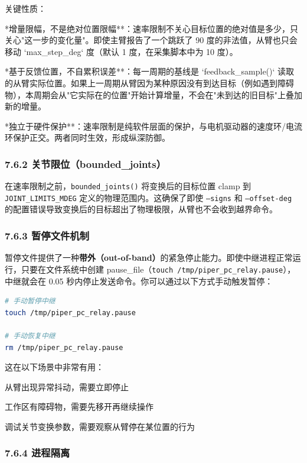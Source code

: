 \documentclass[UTF8,a4paper,11pt]{ctexart}
\begin{document}
{关键性质：
\item **增量限幅，不是绝对位置限幅**：速率限制不关心目标位置的绝对值是多少，只关心"这一步的变化量"。即使主臂报告了一个跳跃了 90 度的非法值，从臂也只会移动 `max_step_deg` 度（默认 1 度，在采集脚本中为 10 度）。
\item **基于反馈位置，不自累积误差**：每一周期的基线是 `feedback_sample()` 读取的从臂实际位置。如果上一周期从臂因为某种原因没有到达目标（例如遇到障碍物），本周期会从"它实际在的位置"开始计算增量，不会在"未到达的旧目标"上叠加新的增量。
\item **独立于硬件保护**：速率限制是纯软件层面的保护，与电机驱动器的速度环/电流环保护正交。两者同时生效，形成纵深防御。

\subsubsection{7.6.2 关节限位（bounded_joints）}

在速率限制之前，\texttt{bounded_joints()} 将变换后的目标位置 clamp 到 \texttt{JOINT_LIMITS_MDEG} 定义的物理范围内。这确保了即使 \texttt{--signs} 和 \texttt{--offset-deg} 的配置错误导致变换后的目标超出了物理极限，从臂也不会收到越界命令。

\subsubsection{7.6.3 暂停文件机制}

暂停文件提供了一种\textbf{带外（out-of-band）}的紧急停止能力。即使中继进程正常运行，只要在文件系统中创建 pause_file（\texttt{touch /tmp/piper_pc_relay.pause}），中继就会在 0.05 秒内停止发送命令。你可以通过以下方式手动触发暂停：

\begin{lstlisting}[language=bash]
# 手动暂停中继
touch /tmp/piper_pc_relay.pause

# 手动恢复中继
rm /tmp/piper_pc_relay.pause
\end{lstlisting}

这在以下场景中非常有用：
\item 从臂出现异常抖动，需要立即停止
\item 工作区有障碍物，需要先移开再继续操作
\item 调试关节变换参数，需要观察从臂停在某位置的行为

\subsubsection{7.6.4 进程隔离}

}
\end{document}
